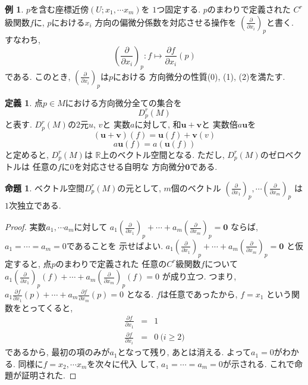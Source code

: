 \documentclass[a4j,12pt]{jarticle}
\theoremstyle{definition}
\newtheorem{definition}[theorem]{定義}
\newtheorem{proposition}[theorem]{命題}
\newtheorem{example}[theorem]{例}
\begin{document}
    \begin{example}
        $p$を含む座標近傍$(U;x_1,\cdots x_m)$を
        $1$つ固定する. $p$のまわりで定義された
        $C^r$級関数$f$に, $p$における$x_i$
        方向の偏微分係数を対応させる操作を
        $\left(\frac{\partial}{\partial x_i}
        \right)_p$と書く. すなわち, 
        $$\left(\frac{\partial}{\partial x_i}
        \right)_p:f\mapsto 
        \frac{\partial f}{\partial x_i}(p)$$
        である.  
        このとき, $\left(\frac{\partial}
        {\partial x_i}\right)_p$は$p$における
        方向微分の性質(0), (1), (2)を満たす. 
    \end{example}
    \begin{definition}
        点$p\in M$における方向微分全ての集合を
        $$D_p^r(M)$$
        と表す. $D_p^r(M)$の$2$元$u$, $v$と
        実数$a$に対して, 
        和$\boldsymbol{u}+\boldsymbol{v}$と
        実数倍$a\boldsymbol{u}$を
        $$(\boldsymbol{u}+\boldsymbol{v})(f)=
        \boldsymbol{u}(f)+\boldsymbol{v}(v)$$
        $$a\boldsymbol{u}(f)=
        a(\boldsymbol{u}(f))$$
        と定めると, $D_p^r(M)$は
        $\mathbb{R}$上のベクトル空間となる. 
        ただし, $D_p^r(M)$のゼロベクトルは
        任意の$f$に$0$を対応させる自明な
        方向微分$\boldsymbol{0}$である. 
    \end{definition}
    \begin{proposition}
        ベクトル空間$D_p^r(M)$の元として, 
        $m$個のベクトル
        $\left(\frac{\partial}{\partial x_1}\right)_p, 
        \cdots 
        \left(\frac{\partial}{\partial x_m}\right)_p$
        は$1$次独立である. 
    \end{proposition}
    \begin{proof}
        実数$a_1,\cdots a_m$に対して
        $a_1\left(\frac{\partial}{\partial x_1}\right)_p+
        \cdots +
        a_m\left(\frac{\partial}{\partial x_m}\right)_p=
        \boldsymbol{0}$
        ならば, $a_1=\cdots =a_m=0$であることを
        示せばよい. 
        $a_1\left(\frac{\partial}{\partial x_1}\right)_p+
        \cdots +
        a_m\left(\frac{\partial}{\partial x_m}\right)_p=
        \boldsymbol{0}$
        と仮定すると, 点$p$のまわりで定義された
        任意の$C^r$級関数$f$について
        $a_1\left(\frac{\partial}{\partial x_1}\right)_p(f)+
        \cdots +
        a_m\left(\frac{\partial}{\partial x_m}\right)_p(f)=
        0$
        が成り立つ. つまり, 
        $a_1\frac{\partial f}{\partial x_1}(p)+
        \cdots +
        a_m\frac{\partial f}{\partial x_m}(p)=
        0$
        となる. $f$は任意であったから, $f=x_1$
        という関数をとってくると, 
        \begin{eqnarray*}
            \frac{\partial f}{\partial x_1}&=&1\\
            \frac{\partial f}{\partial x_i}&=&0
            \ \text{($i\geq 2$)}
        \end{eqnarray*}
        であるから, 最初の項のみが$a_1$となって残り, 
        あとは消える. よって$a_1=0$がわかる. 
        同様に$f=x_2,\cdots x_m$を次々に代入
        して, $a_1=\cdots =a_m=0$が示される. 
        これで命題が証明された. 
    \end{proof}
\end{document}
